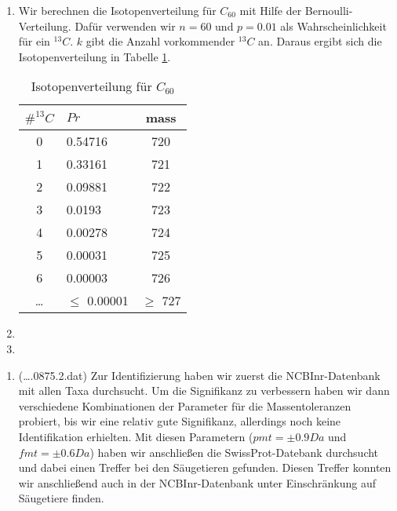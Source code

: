 \documentclass{homework}
\date{Montag, dem 4. Februar 2013}
\author{Stefan Meißner (4279113) und Niels Hoppe (4356370)}
\begin{document}
\maketitle
\begin{enumerate} 

\begin{enumerate}
\item
Wir berechnen die Isotopenverteilung für $C_{60}$ mit Hilfe der Bernoulli-Verteilung.
Dafür verwenden wir $n = 60$ und $p = 0.01$ als Wahrscheinlichkeit für ein $^{13}C$.
$k$ gibt die Anzahl vorkommender $^{13}C$ an.
Daraus ergibt sich die Isotopenverteilung in Tabelle \ref{tab:a49i}.

\begin{table}[H]
\centering
\begin{tabular}{clc}
$\#^{13}C$	& $Pr$	& mass\\\hline
0	& 0.54716	& 720\\
1	& 0.33161	& 721\\
2	& 0.09881	& 722\\
3	& 0.0193	& 723\\
4	& 0.00278	& 724\\
5	& 0.00031	& 725\\
6	& 0.00003	& 726\\
\ldots	& $\leq$ 0.00001	& $\geq$ 727\\
\end{tabular}
\caption{Isotopenverteilung für $C_{60}$}
\label{tab:a49i}
\end{table}

\item 
\item 
\end{enumerate}

\begin{enumerate}
\item (\ldots.0875.2.dat)
Zur Identifizierung haben wir zuerst die NCBInr-Datenbank mit allen Taxa durchsucht.
Um die Signifikanz zu verbessern haben wir dann verschiedene Kombinationen der Parameter für die Massentoleranzen probiert,
bis wir eine relativ gute Signifikanz, allerdings noch keine Identifikation erhielten.
Mit diesen Parametern ($pmt = \pm 0.9 Da$ und $fmt = \pm 0.6 Da$) haben wir anschließen die SwissProt-Datebank durchsucht und dabei einen Treffer bei den Säugetieren gefunden.
Diesen Treffer konnten wir anschließend auch in der NCBInr-Datenbank unter Einschränkung auf Säugetiere finden.


\end{enumerate}
\end{enumerate}
\end{document}
